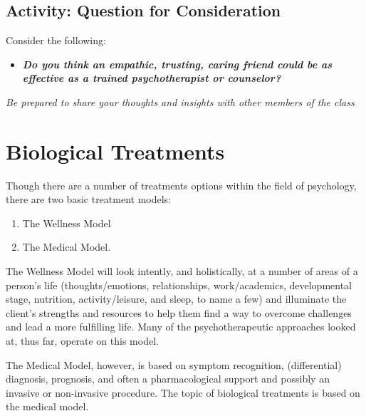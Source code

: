 \documentclass[
]{book}
\providecommand{\tightlist}{%
  \setlength{\itemsep}{0pt}\setlength{\parskip}{0pt}}
\begin{document}
\hypertarget{activity-question-for-consideration-7}{%
\subsection*{Activity: Question for Consideration}\label{activity-question-for-consideration-7}}

\begin{reflect}
Consider the following:

\begin{itemize}
\tightlist
\item
  \textbf{\emph{Do you think an empathic, trusting, caring friend could be as effective as a trained psychotherapist or counselor?}}
\end{itemize}

\emph{Be prepared to share your thoughts and insights with other members of the class}
\end{reflect}

\hypertarget{biological-treatments}{%
\section{Biological Treatments}\label{biological-treatments}}

Though there are a number of treatments options within the field of psychology, there are two basic treatment models:

\begin{enumerate}
\def\labelenumi{\arabic{enumi}.}
\tightlist
\item
  The Wellness Model\\
\item
  The Medical Model.
\end{enumerate}

The Wellness Model will look intently, and holistically, at a number of areas of a person's life (thoughts/emotions, relationships, work/academics, developmental stage, nutrition, activity/leisure, and sleep, to name a few) and illuminate the client's strengths and resources to help them find a way to overcome challenges and lead a more fulfilling life. Many of the psychotherapeutic approaches looked at, thus far, operate on this model.

The Medical Model, however, is based on symptom recognition, (differential) diagnosis, prognosis, and often a pharmacological support and possibly an invasive or non-invasive procedure. The topic of biological treatments is based on the medical model.
\end{document}
